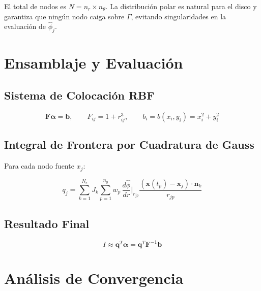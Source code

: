 \documentclass[12pt,a4paper]{article}
\begin{document}
El total de nodos es $N = n_r \times n_\theta$. La distribución polar es
natural para el disco y garantiza que ningún nodo caiga sobre $\Gamma$,
evitando singularidades en la evaluación de $\hat{\phi}_j$.

\section{Ensamblaje y Evaluación}

\subsection{Sistema de Colocación RBF}

\begin{equation}
    \mathbf{F}\boldsymbol{\alpha} = \mathbf{b},
    \qquad F_{ij} = 1 + r_{ij}^3,
    \qquad b_i = b(x_i, y_i) = x_i^2 + y_i^2
\end{equation}

\subsection{Integral de Frontera por Cuadratura de Gauss}

Para cada nodo fuente $x_j$:

\begin{equation}
    q_j = \sum_{k=1}^{N_e} J_k \sum_{p=1}^{n_g} w_p\,
    \frac{d\hat{\phi}}{dr}\bigg|_{r_{jp}}
    \frac{(\mathbf{x}(t_p) - \mathbf{x}_j)\cdot\mathbf{n}_k}{r_{jp}}
\end{equation}

\subsection{Resultado Final}

\begin{equation}
    I \approx \mathbf{q}^T\boldsymbol{\alpha}
    = \mathbf{q}^T\mathbf{F}^{-1}\mathbf{b}
\end{equation}

\section{Análisis de Convergencia}
\end{document}
